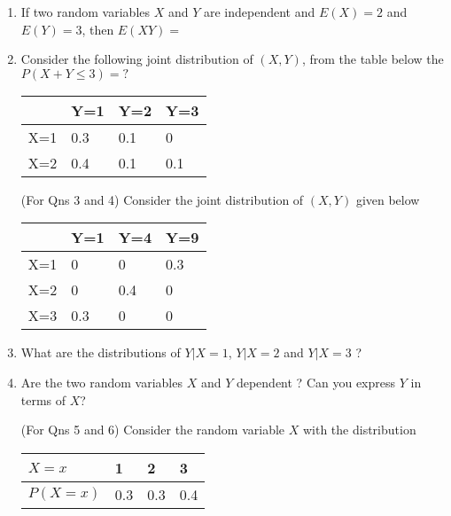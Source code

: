 \documentclass{article}
\begin{document}
\begin{enumerate}
\item If two random variables $X$ and $Y$ are independent and $E(X)=2$ and $E(Y)=3$, then $E(XY)=$
\vspace{3cm}

\item Consider the following joint distribution of $(X,Y)$, from the table below the $P(X+Y \leq 3)=?$\\

\begin{center}
\begin{tabular}{| l | l | l | l|}
    \hline
          & Y=1 & Y=2 & Y=3 \\ \hline
     X=1 & 0.3 & 0.1 & 0 \\ \hline
     X=2 & 0.4 & 0.1 & 0.1 \\ \hline
\end{tabular}
\end{center}


\vspace{2cm}

(For Qns 3 and 4) Consider the joint distribution of $(X,Y)$ given below \\
\begin{center}
\begin{tabular}{| l | l | l | l|}
    \hline
          & Y=1 & Y=4 & Y=9 \\ \hline
     X=1 & 0 & 0 & 0.3 \\ \hline
     X=2 & 0 & 0.4 & 0 \\ \hline
     X=3 & 0.3 & 0 & 0 \\ \hline
    \end{tabular}
\end{center}

\vspace{1cm}

\item What are the distributions of $Y|X=1$, $Y|X=2$ and $Y|X=3$ ?
\newpage

\item Are the two random variables $X$ and $Y$ dependent ? Can you express $Y$ in terms of $X$?

\vspace{5cm}

(For Qns 5 and 6) Consider the random variable $X$ with the distribution

\begin{center}
\begin{tabular}{| l | l | l | l|}
    \hline
     $X=x$    & 1 & 2 & 3 \\ \hline
     $P(X=x)$ & 0.3 & 0.3 & 0.4 \\ \hline
    \end{tabular}
\end{center}



\end{enumerate}
\end{document}
